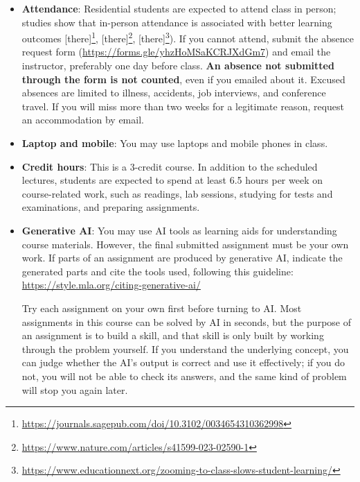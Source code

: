 \documentclass[11pt, a4paper]{article}
\begin{document}
\begin{itemize}
    \item \textbf{Attendance}: Residential students are expected to attend class in person; studies show that in-person attendance is associated with better learning outcomes [there]\footnote{\url{https://journals.sagepub.com/doi/10.3102/0034654310362998}}, [there]\footnote{\url{https://www.nature.com/articles/s41599-023-02590-1}}, [there]\footnote{\url{https://www.educationnext.org/zooming-to-class-slows-student-learning/}}). If you cannot attend, submit the absence request form (\url{https://forms.gle/yhzHoMSaKCRJXdGm7}) and email the instructor, preferably one day before class. \textbf{An absence not submitted through the form is not counted}, even if you emailed about it. Excused absences are limited to illness, accidents, job interviews, and conference travel. If you will miss more than two weeks for a legitimate reason, request an accommodation by email.
    \item \textbf{Laptop and mobile}: You may use laptops and mobile phones in class.
    \item \textbf{Credit hours}: This is a 3-credit course. In addition to the scheduled lectures, students are expected to spend at least 6.5 hours per week on course-related work, such as readings, lab sessions, studying for tests and examinations, and preparing assignments.
    \item \textbf{Generative AI}: You may use AI tools as learning aids for understanding course materials. However, the final submitted assignment must be your own work. If parts of an assignment are produced by generative AI, indicate the generated parts and cite the tools used, following this guideline: \url{https://style.mla.org/citing-generative-ai/}

    Try each assignment on your own first before turning to AI. Most assignments in this course can be solved by AI in seconds, but the purpose of an assignment is to build a skill, and that skill is only built by working through the problem yourself. If you understand the underlying concept, you can judge whether the AI's output is correct and use it effectively; if you do not, you will not be able to check its answers, and the same kind of problem will stop you again later.


\end{itemize}
\end{document}
